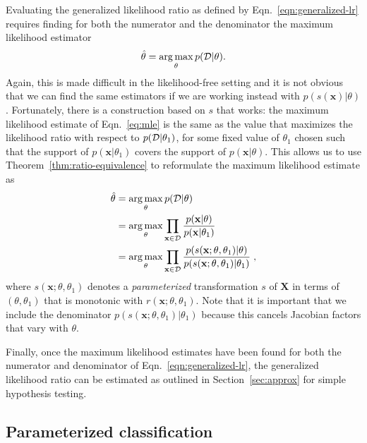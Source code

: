 \documentclass[12pt]{article}
\DeclareMathOperator*{\argmax}{arg\,max}
\numberwithin{equation}{section}
\theoremstyle{plain}
\begin{document}
Evaluating the generalized likelihood ratio as defined by
Eqn.~\ref{eqn:generalized-lr} requires finding for both the numerator and the
denominator the maximum likelihood estimator
\begin{equation}\label{eq:mle}
    \hat{\theta} = \argmax_\theta p({\cal D} | \theta).
\end{equation}
Again, this is made difficult in the likelihood-free setting and it is not
obvious that we can find the same estimators if we are working instead with
$p(s(\mathbf{x})|\theta)$. Fortunately, there is a construction
based on $s$ that works: the maximum likelihood estimate of Eqn.~\ref{eq:mle} is
the same as the value that maximizes the likelihood ratio with respect to
$p({\cal D}|\theta_1)$, for some fixed value of $\theta_1$ chosen such that the support of $p(\mathbf{x}|\theta_1)$ covers the support of $p(\mathbf{x}|\theta)$.
This allows us to
use Theorem~\ref{thm:ratio-equivalence} to reformulate the maximum likelihood
estimate as
\begin{align}\label{eq:mle_withs}
\hat{\theta} &= \argmax_\theta  p({\cal D} | \theta) \nonumber \\
&= \argmax_\theta  \prod_{\mathbf{x} \in {\cal D}} \frac{p(\mathbf{x}| \theta)}{p(\mathbf{x}|\theta_1)} \nonumber \\
&= \argmax_\theta  \prod_{\mathbf{x} \in {\cal D}} \frac{p(s(\mathbf{x}; \theta, \theta_1) | \theta)}{p(s(\mathbf{x}; \theta, \theta_1) |\theta_1)} \;,
\end{align}
where $s(\mathbf{x};\theta,\theta_1)$ denotes a \textit{parameterized}
transformation $s$ of $\mathbf{X}$ in terms of $(\theta,\theta_1)$ that is monotonic
with $r(\mathbf{x};\theta,\theta_1)$. Note that it is important that we include
the denominator $p(s(\mathbf{x}; \theta, \theta_1) |\theta_1)$ because this
cancels Jacobian factors that vary with $\theta$.

Finally, once the maximum likelihood estimates have been found for both the numerator
and denominator of Eqn.~\ref{eqn:generalized-lr}, the generalized likelihood
ratio can be estimated as outlined in Section~\ref{sec:approx}
for simple hypothesis testing.



\subsection{Parameterized classification}
\label{sec:param-clf}
\end{document}

